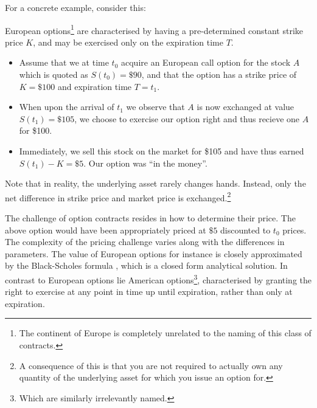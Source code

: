 For a concrete example, consider this:
\begin{example}
\label{example:europeancall} 
  European options\footnote{The continent of Europe is completely unrelated to
  the naming of this class of contracts.} are characterised by having a pre-determined
  constant strike price $K$, and may be exercised only on the expiration time
  $T$.

  \begin{itemize}
  \item Assume that we at time $t_0$ acquire an European call option
    for the stock $A$ which is quoted as $S(t_0)=\$90$, and that the
    option has a strike price of $K=\$100$ and expiration time
    $T=t_1$.


  \item When upon the arrival of $t_1$ we observe that $A$ is now
    exchanged at value $S(t_1)=\$105$, we choose to exercise our option right
    and thus recieve one $A$ for \$100.

    \item Immediately, we sell this stock on the market for \$105 and have thus
      earned $S(t_1)-K=\$5$. Our option was ``in the money''.
  \end{itemize}

  Note that in reality, the underlying asset rarely changes
  hands. Instead, only the net difference in strike price and market
  price is exchanged.\footnote{A consequence of this is that you are
    not required to actually own any quantity of the underlying asset
    for which you issue an option for.}
\end{example}

The challenge of option contracts resides in how to determine their
price. The above option would have been appropriately priced at $\$5$
discounted to $t_0$ prices. The complexity of the pricing challenge
varies along with the differences in parameters.  The value of
European options for instance is closely approximated by the
Black-Scholes formula \cite{black1973pricing}, which is a closed form
analytical solution.  In contrast to European options lie American
options\footnote{Which are similarly irrelevantly named.},
characterised by granting the right to exercise at any point in time
up until expiration, rather than only at expiration.

